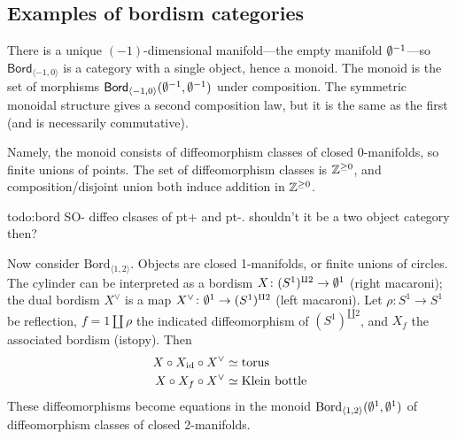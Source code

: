 \subsection{Examples of bordism categories}
\begin{example}
    There is a unique $(-1)$-dimensional manifold---the empty manifold $\emptyset ^{-1}$---so $\mathsf{Bord} _{\langle -1,0 \rangle }$ is a category with a single object, hence a monoid. The monoid is the set of morphisms $\mathsf{Bord} _{\langle -1,0 \rangle }(\emptyset^{-1},\emptyset^{-1})$ under composition. The symmetric monoidal structure gives a second composition law, but it is the same as the first (and is necessarily commutative).
    
    Namely, the monoid consists of diffeomorphism classes of closed 0-manifolds, so finite unions of points. The set of diffeomorphism classes is $\mathbb{Z} ^{\geq 0}$, and composition/disjoint union both induce addition in $\mathbb{Z} ^{\geq 0}$.
\end{example}
{\color{red}todo:bord SO- diffeo clsases of pt+ and pt-. shouldn't it be a two object category then?} 
\begin{example}
    Now consider $\mathrm{Bord}_{\langle 1,2 \rangle }$. Objects are closed 1-manifolds, or finite unions of circles. The cylinder can be interpreted as a bordism $X \colon (S^1 )^{\amalg 2} \to \emptyset^1$ (right macaroni); the dual bordism $X^{\vee}$ is a map $X ^{\vee}\colon \emptyset^1 \to (S^1 )^{\amalg 2}$ (left macaroni). Let $\rho \colon S^1  \to S^1 $ be reflection, $f =1 \amalg \rho$ the indicated diffeomorphism of $(S^1 )^{\amalg 2}$, and $X_f$ the associated bordism (istopy). Then 
    \begin{align*}
        X \circ X_{\operatorname{id}}\circ X^{\vee}&\simeq  \text{torus} \\
        X \circ X_{f}\circ X^{\vee}&\simeq  \text{Klein bottle} 
    \end{align*}
    These diffeomorphisms become equations in the monoid $\mathrm{Bord}_{\langle 1,2 \rangle }(\emptyset^1,\emptyset^1)$ of diffeomorphism classes of closed 2-manifolds.
\end{example}




